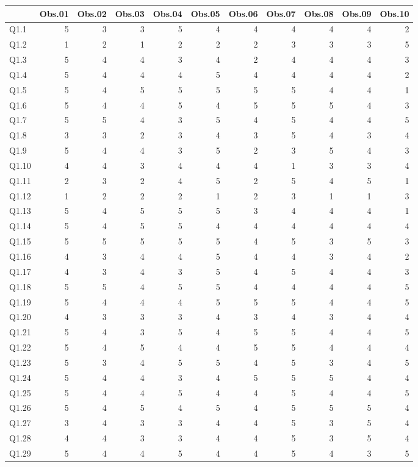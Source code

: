 \documentclass[
]{article}
\begin{document}
\begin{center}
\begin{longtable}{lrrrrrrrrrr}
\toprule
  & Obs.01 & Obs.02 & Obs.03 & Obs.04 & Obs.05 & Obs.06 & Obs.07 & Obs.08 & Obs.09 & Obs.10\\
\midrule
Q1.1 & 5 & 3 & 3 & 5 & 4 & 4 & 4 & 4 & 4 & 2\\
Q1.2 & 1 & 2 & 1 & 2 & 2 & 2 & 3 & 3 & 3 & 5\\
Q1.3 & 5 & 4 & 4 & 3 & 4 & 2 & 4 & 4 & 4 & 3\\
Q1.4 & 5 & 4 & 4 & 4 & 5 & 4 & 4 & 4 & 4 & 2\\
Q1.5 & 5 & 4 & 5 & 5 & 5 & 5 & 5 & 4 & 4 & 1\\
\addlinespace
Q1.6 & 5 & 4 & 4 & 5 & 4 & 5 & 5 & 5 & 4 & 3\\
Q1.7 & 5 & 5 & 4 & 3 & 5 & 4 & 5 & 4 & 4 & 5\\
Q1.8 & 3 & 3 & 2 & 3 & 4 & 3 & 5 & 4 & 3 & 4\\
Q1.9 & 5 & 4 & 4 & 3 & 5 & 2 & 3 & 5 & 4 & 3\\
Q1.10 & 4 & 4 & 3 & 4 & 4 & 4 & 1 & 3 & 3 & 4\\
\addlinespace
Q1.11 & 2 & 3 & 2 & 4 & 5 & 2 & 5 & 4 & 5 & 1\\
Q1.12 & 1 & 2 & 2 & 2 & 1 & 2 & 3 & 1 & 1 & 3\\
Q1.13 & 5 & 4 & 5 & 5 & 5 & 3 & 4 & 4 & 4 & 1\\
Q1.14 & 5 & 4 & 5 & 5 & 4 & 4 & 4 & 4 & 4 & 4\\
Q1.15 & 5 & 5 & 5 & 5 & 5 & 4 & 5 & 3 & 5 & 3\\
\addlinespace
Q1.16 & 4 & 3 & 4 & 4 & 5 & 4 & 4 & 3 & 4 & 2\\
Q1.17 & 4 & 3 & 4 & 3 & 5 & 4 & 5 & 4 & 4 & 3\\
Q1.18 & 5 & 5 & 4 & 5 & 5 & 4 & 4 & 4 & 4 & 5\\
Q1.19 & 5 & 4 & 4 & 4 & 5 & 5 & 5 & 4 & 4 & 5\\
Q1.20 & 4 & 3 & 3 & 3 & 4 & 3 & 4 & 3 & 4 & 4\\
\addlinespace
Q1.21 & 5 & 4 & 3 & 5 & 4 & 5 & 5 & 4 & 4 & 5\\
Q1.22 & 5 & 4 & 5 & 4 & 4 & 5 & 5 & 4 & 4 & 4\\
Q1.23 & 5 & 3 & 4 & 5 & 5 & 4 & 5 & 3 & 4 & 5\\
Q1.24 & 5 & 4 & 4 & 3 & 4 & 5 & 5 & 5 & 4 & 4\\
Q1.25 & 5 & 4 & 4 & 5 & 4 & 4 & 5 & 4 & 4 & 5\\
\addlinespace
Q1.26 & 5 & 4 & 5 & 4 & 5 & 4 & 5 & 5 & 5 & 4\\
Q1.27 & 3 & 4 & 3 & 3 & 4 & 4 & 5 & 3 & 5 & 4\\
Q1.28 & 4 & 4 & 3 & 3 & 4 & 4 & 5 & 3 & 5 & 4\\
Q1.29 & 5 & 4 & 4 & 5 & 4 & 4 & 5 & 4 & 3 & 5\\
\bottomrule
\end{longtable}\end{center}
\end{document}
